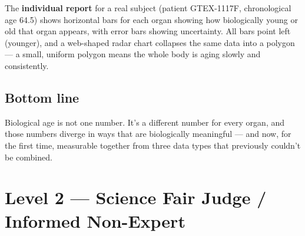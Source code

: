 \documentclass[11pt]{article}
\begin{document}
\begin{tcolorbox}[L1box]
The \textbf{individual report} for a real subject (patient GTEX-1117F, chronological age 64.5) shows horizontal bars for each organ showing how biologically young or old that organ appears, with error bars showing uncertainty. All bars point left (younger), and a web-shaped radar chart collapses the same data into a polygon --- a small, uniform polygon means the whole body is aging slowly and consistently.

\subsection{Bottom line}

Biological age is not one number. It's a different number for every organ, and those numbers diverge in ways that are biologically meaningful --- and now, for the first time, measurable together from three data types that previously couldn't be combined.

\end{tcolorbox}

\newpage

\section{\textcolor{L2color}{Level 2 \textnormal{---} Science Fair Judge / Informed Non-Expert}}
\end{document}
